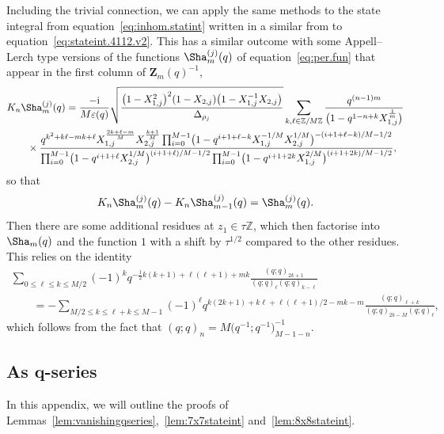 \documentclass[pdftex]{sigma}
\numberwithin{equation}{section}
\def\BZ{\mathbb{Z}}
\def\WRT{\Sha}
\def\etaroots{\varepsilon}
\def\BZ{\mathbb Z}
\begin{document}
Including the trivial connection, we can apply the same methods to the state integral from equation~\eqref{eq:inhom.statint} written in a similar from to equation~\eqref{eq:stateint.4112.v2}. This has a similar outcome with some Appell--Lerch type versions of the functions $\WRT^{(j)}_{m}(q)$ of equation~\eqref{eq:per.fun} that appear in the first column of $\mathbf{Z}_{m}(q)^{-1}$,
\begin{align*}%
 &K_n\WRT^{(j)}_{m}(q) =\frac{-{\rm i}}{M\etaroots(q)}\sqrt{\frac{\bigl(1-X_{1,j}^2\bigr)^2(1-X_{2,j})\bigl(1-X_{1,j}^{-1}X_{2,j}\bigr)}{\Delta_{\rho_j}}} \sum_{k,\ell\in\BZ/M\BZ}\frac{q^{(n-1)m}}{\bigl(1-q^{1-n+k}X_{1,j}^{\frac{1}{m}}\bigr)}\\
 &\qquad\times
 \frac{q^{k^2+k\ell-mk+\ell}X_{1,j}^{\frac{2k+\ell-m}{M}}X_{2,j}^{\frac{k+1}{M}}\prod_{i=0}^{M-1} \bigl(1-q^{i+1+\ell-k}X_{1,j}^{-1/M}X_{2,j}^{1/M}\bigr)^{-(i+1+\ell-k)/M-1/2}} {\prod_{i=0}^{M-1}\bigl(1-q^{i+1+\ell}X_{2,j}^{1/M}\bigr)^{(i+1+\ell)/M-1/2}\prod_{i=0}^{M-1}\bigl(1-q^{i+1+2k}X_{1,j}^{2/M}\bigr)^{(i+1+2k)/M-1/2}} ,
\end{align*}
so that
\[
 K_n\WRT^{(j)}_{m}(q)-K_n\WRT^{(j)}_{m-1}(q)
  =
 \WRT^{(j)}_{m}(q) .
\]
Then there are some additional residues at $z_1\in\tau\BZ$, which then factorise into $\WRT_{m}(q)$ and the function $1$ with a shift by $\tau^{1/2}$ compared to the other residues. This relies on the identity
\begin{gather*}
  \sum_{0\leq\ell\leq k\leq M/2}(-1)^{k}q^{-\frac{1}{2}k(k+1)+\ell(\ell+1)+mk}\frac{(q;q)_{2k+1}}{(q;q)_{\ell}(q;q)_{k-\ell}}\\
\qquad =
 -\sum_{M/2\leq k\leq \ell+k\leq M-1}(-1)^{\ell}q^{k(2k+1)+k\ell+\ell(\ell+1)/2-mk-m}\frac{(q;q)_{\ell+k}}{(q;q)_{2k-M}(q;q)_{\ell}} ,
\end{gather*}
which follows from the fact that $(q;q)_{n}=M\bigl(q^{-1};q^{-1}\bigr)_{M-1-n}^{-1}$.

\subsection[As $q$-series]{As $\boldsymbol{q}$-series}\label{sec:qserfac}

In this appendix, we will outline the proofs of Lemmas~\ref{lem:vanishingqseries},~\ref{lem:7x7stateint} and~\ref{lem:8x8stateint}.
\end{document}
